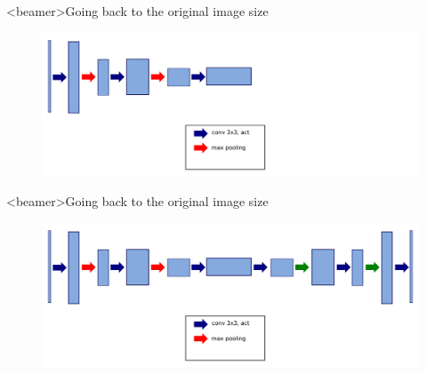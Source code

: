\documentclass[xcolor=pdftex,dvipsnames,table,mathserif]{beamer}
\begin{document}

\begin{frame}<beamer>{Going back to the original image size}

    \begin{figure}
      \includegraphics[width=\textwidth]{going_back1.png}
    \end{figure}

\end{frame}


\begin{frame}<beamer>{Going back to the original image size}

    \begin{figure}
      \includegraphics[width=\textwidth]{going_back2.png}
    \end{figure}

\end{frame}
\end{document}
